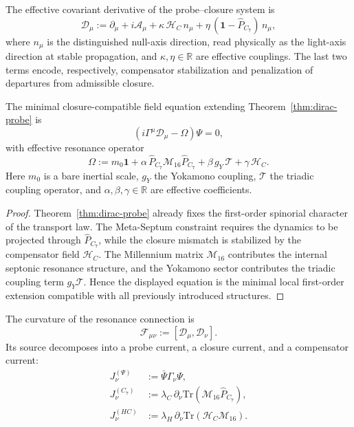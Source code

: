 \begin{definition}
The effective covariant derivative of the probe--closure system is
\[
  \mathcal D_\mu
  :=
  \partial_\mu
  + i\mathcal A_\mu
  + \kappa\,\mathcal H_C\,n_\mu
  + \eta\,(\mathbf 1-\hat P_{C_7})\,n_\mu,
\]
where $n_\mu$ is the distinguished null-axis direction, read physically as the light-axis direction at stable propagation, and
$\kappa,\eta\in\mathbb R$ are effective couplings.
The last two terms encode, respectively, compensator stabilization and
penalization of departures from admissible closure.
\end{definition}

\begin{theorem}
\label{thm:master-field-equation}
The minimal closure-compatible field equation extending
Theorem~\ref{thm:dirac-probe} is
\[
  \left(
    i\Gamma^\mu\mathcal D_\mu
    - \Omega
  \right)\Psi = 0,
\]
with effective resonance operator
\[
  \Omega
  :=
  m_0\mathbf 1
  + \alpha\,\hat P_{C_7}\mathcal M_{16}\hat P_{C_7}
  + \beta\,g_Y\,\mathcal T
  + \gamma\,\mathcal H_C.
\]
Here $m_0$ is a bare inertial scale, $g_Y$ the Yokamono coupling,
$\mathcal T$ the triadic coupling operator, and
$\alpha,\beta,\gamma\in\mathbb R$ are effective coefficients.
\end{theorem}

\begin{proof}
Theorem~\ref{thm:dirac-probe} already fixes the first-order spinorial
character of the transport law.
The Meta-Septum constraint requires the dynamics to be projected through
$\hat P_{C_7}$, while the closure mismatch is stabilized by the
compensator field $\mathcal H_C$.
The Millennium matrix $\mathcal M_{16}$ contributes the internal
septonic resonance structure, and the Yokamono sector contributes the
triadic coupling term $g_Y\mathcal T$.
Hence the displayed equation is the minimal local first-order extension
compatible with all previously introduced structures.
\end{proof}

\begin{definition}
The curvature of the resonance connection is
\[
  \mathcal F_{\mu\nu} := [\mathcal D_\mu,\mathcal D_\nu].
\]
Its source decomposes into a probe current, a closure current, and a
compensator current:
\begin{align*}
  J^{(\Psi)}_\nu &:= \bar\Psi\Gamma_\nu\Psi,\\
  J^{(C_7)}_\nu &:= \lambda_C\,\partial_\nu
    \mathrm{Tr}(\mathcal M_{16}\hat P_{C_7}),\\
  J^{(HC)}_\nu &:= \lambda_H\,\partial_\nu
    \mathrm{Tr}(\mathcal H_C\mathcal M_{16}).
\end{align*}
\end{definition}

